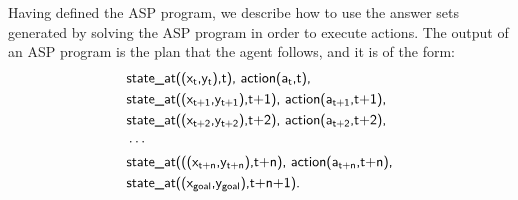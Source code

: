 Having defined the ASP program, we describe how to use the answer sets generated by solving the ASP program in order to execute actions.
The output of an ASP program is the plan that the agent follows, and it is of the form:
\begin{equation}
\begin{split}
&\textsf{state\_at((x\textsubscript{t},y\textsubscript{t}),t), action(a\textsubscript{t},t),}\\
&\textsf{state\_at((x\textsubscript{t+1},y\textsubscript{t+1}),t+1), action(a\textsubscript{t+1},t+1),}\\
&\textsf{state\_at((x\textsubscript{t+2},y\textsubscript{t+2}),t+2), action(a\textsubscript{t+2},t+2),}\\
&\cdots\\
&\textsf{state\_at(((x\textsubscript{t+n},y\textsubscript{t+n}),t+n), action(a\textsubscript{t+n},t+n),}\\
&\textsf{state\_at((x\textsubscript{goal},y\textsubscript{goal}),t+n+1).} 
\end{split}
\end{equation}

